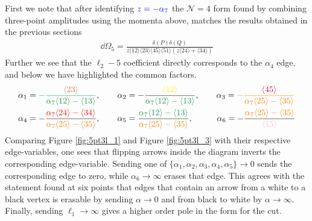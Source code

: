 \documentclass[letter,11pt]{article}
\newcommand{\pink}[1]{\textcolor{pink}{#1}}
\newcommand{\green}[1]{\textcolor{ForestGreen}{#1}}
\newcommand{\orange}[1]{\textcolor{orange}{#1}}
\newcommand{\brown}[1]{\textcolor{brown}{#1}}
\newcommand{\ab}[1]{\langle #1 \rangle}
\begin{document}
First we note that after identifying $\textcolor{blue}{z=-\alpha_7}$ the $\mathcal{N}=4$ form found by combining three-point amplitudes using the momenta above, matches the results obtained in the previous sections
\begin{equation}
	\begin{aligned}
	\dd \Omega_5=\frac{\delta(P)\delta(Q)}{z \ab{12}\ab{23}\ab{45}\ab{51}\left(z\ab{24}+\ab{34}\right)}
	\end{aligned}
\end{equation}
Further we see that the $\ell_2-5$ coefficient directly corresponds to the $\alpha_4$ edge, and below we have highlighted the common factors.
\begin{equation}
	\begin{aligned}
		\alpha_1&=\textcolor{ForestGreen}{-\frac{\brown{\ab{23}}}{\alpha_7\ab{12}-\ab{13}}},~~~~~~
		\alpha_2=-\frac{\textcolor{yellow}{\ab{12}}}{\green{\alpha_7\ab{12}-\ab{13}}},~~~~~~
		\alpha_3=\textcolor{orange}{-\frac{\textcolor{purple}{\ab{45}}}{\alpha_7\ab{25}-\ab{35}}}\\
		\alpha_4&=-\frac{\textcolor{red}{\alpha_7\ab{24}-\ab{34}}}{\orange{\alpha_7\ab{25}-\ab{35}}}
		,~~~~~~
		\alpha_5=\frac{\green{\alpha_7\ab{12}-\ab{13}}}{\orange{\alpha_7\ab{25}-\ab{35}}}
		,~~~~~~~~\,
		\alpha_6=-\frac{\orange{\alpha_7\ab{25}-\ab{35}}}{\pink{\ab{15}}}
	\end{aligned}
\end{equation}
Comparing Figure \ref{fig:5pt3l_1} and Figure \ref{fig:5pt3l_3} with their respective edge-variables, one sees that flipping arrows inside the diagram inverts the corresponding edge-variable. Sending one of $\{\alpha_1,\alpha_2,\alpha_3,\alpha_4,\alpha_5\}\to 0$ sends the corresponding edge to zero, while $\alpha_6\to\infty $ erases that edge. This agrees with the statement found at six points that edges that contain an arrow from a white to a black vertex is erasable by sending $\alpha\to 0$ and from black to white by $\alpha\to \infty$.  Finally, sending $\ell_1\to \infty$ gives a higher order pole in the form for the cut.
\newpage
\end{document}
